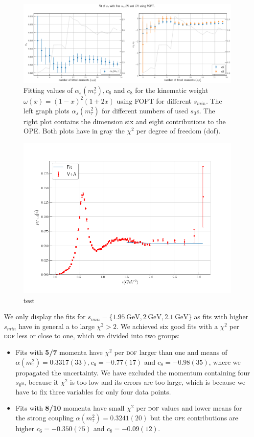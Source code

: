 \documentclass[../../index.tex]{subfiles}
\begin{document}
\begin{figure}
  \centering
  \includegraphics[width=\textwidth]{./images/fitWKinAlD6D8.png}
  \caption{Fitting values of $\alpha_s(m_\tau^2), c_6$ and $c_8$ for the kinematic weight
    $\omega(x)=(1-x)^2(1+2x)$ using FOPT for different $s_{min}$. The left graph plots $\alpha_s(m_\tau^2)$ for
    different numbers of used $s_0$s. The right plot contains the dimension six
    and eight contributions to the OPE. Both plots have in gray the $\chi^2$ per
  degree of freedom (dof).}
  \label{fig:fitWKinAlD6D8}
\end{figure}
\begin{figure}
  \centering
  \includegraphics[width=\textwidth]{./images/fitWKinAlD6D8SpecFunc.png}
  \caption{test}
\end{figure}
We only display the fits for $s_{min}=\{\SI{1.95}{\giga\eV}, \SI{2}{\giga\eV},
\SI{2.1}{\giga\eV}\}$ as fits with higher $s_{min}$ have in general a to large
$\chi^2>2$. We achieved six good fits with a $\chi^2$ per \textsc{dof} less or
close to one, which we divided into two groups:
\begin{itemize}
  \item Fits with \textbf{5\-/7} momenta have $\chi^2$ per \textsc{dof} larger
    than one and means of $\alpha(m_\tau^2)=0.3317(33),
    c_6=-0.77(17)$ and $c_8=-0.98(35)$, where we propagated the uncertainty. We
    have excluded the momentum containing four $s_0$s, because it $\chi^2$ is
    too low and its errors are too large, which is because we have to fix three
    variables for only four data points.
  \item Fits with \textbf{8\-/10} momenta have small $\chi^2$ per \textsc{dof}
    values and lower means for the strong
    coupling $\alpha(m_\tau^2)=0.3241(20)$ but the \textsc{ope} contributions
    are higher $c_6=-0.350(75)$ and $c_8=-0.09(12)$.
\end{itemize}
\end{document}
